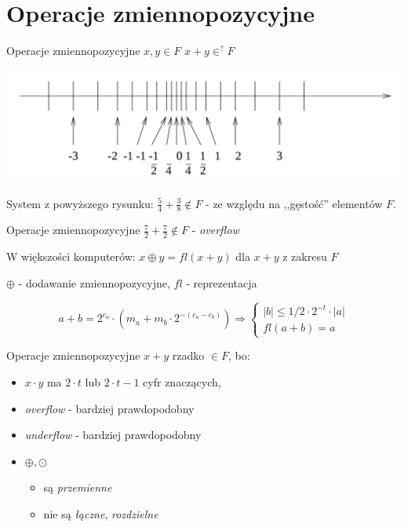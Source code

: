     \section{Operacje zmiennopozycyjne}
    \begin{frame}{Operacje zmiennopozycyjne}
    	$x, y \in F$ \newline
        $x + y \in^? F$
        
        \begin{center}
        \includegraphics[width=0.8\linewidth]{img/2/2_1_axis}
        \end{center}
        System z powyższego rysunku: $\frac{5}{4} + \frac{3}{8} \notin F$ - ze względu na ,,gęstość'' elementów $F$.
    \end{frame}
    \begin{frame}{Operacje zmiennopozycyjne}
        $\frac{7}{2} + \frac{7}{2} \notin F$ - {\it overflow}
        \vspace{.5cm}
        
        W większości komputerów: $x \oplus y = fl(x + y)$ dla $x + y$ z zakresu $F$
        
        $\oplus$ - dodawanie zmiennopozycyjne, \newline
        $fl$ - reprezentacja
        
        \[
        a + b = 2^{c_a} \cdot \left( m_a + m_b \cdot 2^{-(c_a-c_b)} \right) \Rightarrow
        \left\{ 
            \begin{array}{ll}
                |b| \le 1/2 \cdot 2^{-t} \cdot |a| \\
                fl(a + b) = a
            \end{array}
        \right.
        \]
    \end{frame}
    \begin{frame}{Operacje zmiennopozycyjne}
    	$x + y$ rzadko $\in F$, bo:
        \begin{itemize}
        \item $x \cdot y$ ma $2 \cdot t$ lub $2 \cdot t - 1$ cyfr znaczących,
        \item {\it overflow} - bardziej prawdopodobny
        \item {\it underflow} - bardziej prawdopodobny
        \item $\oplus, \odot$
        	\begin{itemize}
            \item są {\it przemienne}
            \item nie są {\it łączne}, {\it rozdzielne}
            \end{itemize}
        \end{itemize}
    \end{frame}
